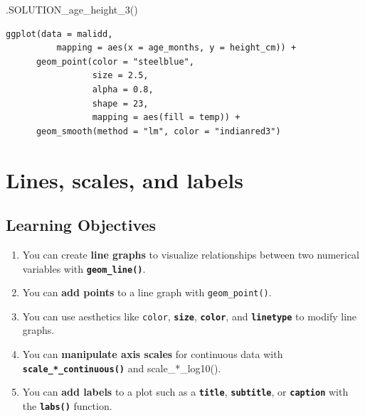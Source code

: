 \documentclass[
  letterpaper,
  DIV=11,
  numbers=noendperiod]{scrreprt}
\newenvironment{Shaded}{\begin{snugshade}}{\end{snugshade}}
\newcommand{\FunctionTok}[1]{\textcolor[rgb]{0.28,0.35,0.67}{#1}}
\newcommand{\NormalTok}[1]{\textcolor[rgb]{0.00,0.23,0.31}{#1}}
\providecommand{\tightlist}{%
  \setlength{\itemsep}{0pt}\setlength{\parskip}{0pt}}\usepackage{longtable,booktabs,array}
\begin{document}
\begin{Shaded}
\begin{Highlighting}[]
\FunctionTok{.SOLUTION\_age\_height\_3}\NormalTok{()}
\end{Highlighting}
\end{Shaded}

\begin{verbatim}
ggplot(data = malidd, 
          mapping = aes(x = age_months, y = height_cm)) + 
      geom_point(color = "steelblue",
                 size = 2.5,
                 alpha = 0.8,
                 shape = 23,
                 mapping = aes(fill = temp)) +
      geom_smooth(method = "lm", color = "indianred3")
\end{verbatim}


\hypertarget{lines-scales-and-labels}{%
\chapter{Lines, scales, and labels}\label{lines-scales-and-labels}}

\hypertarget{learning-objectives-16}{%
\section{Learning Objectives}\label{learning-objectives-16}}

\begin{enumerate}
\def\labelenumi{\arabic{enumi}.}
\tightlist
\item
  You can create \textbf{line graphs} to visualize relationships between
  two numerical variables with \textbf{\texttt{geom\_line()}}.
\item
  You can \textbf{add points} to a line graph with
  \texttt{geom\_point()}.
\item
  You can use aesthetics like \texttt{color}, \textbf{\texttt{size}},
  \textbf{\texttt{color}}, and \textbf{\texttt{linetype}} to modify line
  graphs.
\item
  You can \textbf{manipulate axis scales} for continuous data with
  \textbf{\texttt{scale\_*\_continuous()}} and scale\_*\_log10().
\item
  You can \textbf{add labels} to a plot such as a
  \textbf{\texttt{title}}, \textbf{\texttt{subtitle}}, or
  \textbf{\texttt{caption}} with the \textbf{\texttt{labs()}} function.
\end{enumerate}
\end{document}
